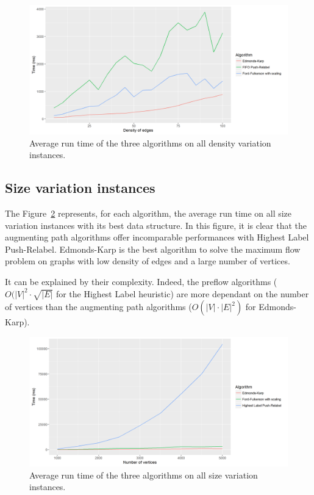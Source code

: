 \begin{figure}[H]
\begin{center}
\includegraphics[scale=0.5]{images/meandensity.png}
\caption{Average run time of the three algorithms on all density variation instances.}
\label{fig:MeanInstances}
\end{center}
\end{figure}




\subsection{Size variation instances}
The Figure~\ref{fig:MeanInstancesize} represents, for each algorithm, the average run time on all size variation instances with its best data structure. In this figure, it is clear that the augmenting path algorithms offer incomparable performances with Highest Label Push-Relabel. Edmonds-Karp is the best algorithm to solve the maximum flow problem on graphs with low density of edges and a large number of vertices.

It can be explained by their complexity. Indeed, the preflow algorithms ($O(|V|^2 \cdot \sqrt{|E|}$ for the Highest Label heuristic) are more dependant on the number of vertices than the augmenting path algorithms ($O(|V| \cdot |E|^2)$ for Edmonds-Karp).

\begin{figure}[H]
\begin{center}
\includegraphics[scale=0.5]{images/meansize.png}
\caption{Average run time of the three algorithms on all size variation instances.}
\label{fig:MeanInstancesize}
\end{center}
\end{figure}




